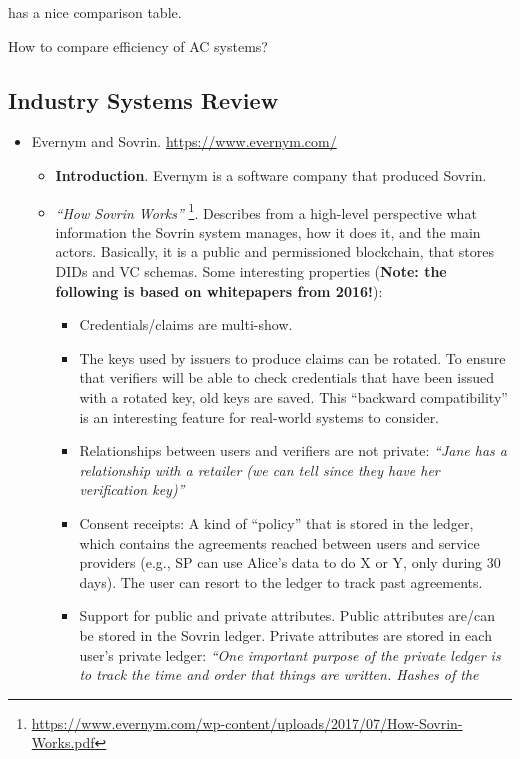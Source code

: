 \cite{fhs19} has a nice comparison table.

How to compare efficiency of AC systems?

\subsection{Industry Systems Review}

\begin{itemize}
\item Evernym and Sovrin. \url{https://www.evernym.com/}
  \begin{itemize}
  \item {\bf Introduction}. Evernym is a software company that produced Sovrin.
  \item \emph{``How Sovrin Works''}%
    \footnote{\url{https://www.evernym.com/wp-content/uploads/2017/07/How-Sovrin-Works.pdf}}.
    Describes from a high-level perspective what information the Sovrin system
    manages, how it does it, and the main actors. Basically, it is a public and
    permissioned blockchain, that stores DIDs and VC schemas.
    Some interesting properties (\textbf{Note: the following is based on
      whitepapers from 2016!}):
    \begin{itemize}
    \item Credentials/claims are multi-show.
    \item The keys used by issuers to produce claims can be rotated. To ensure
      that verifiers will be able to check credentials that have been issued
      with a rotated key, old keys are saved. This ``backward compatibility''
      is an interesting feature for real-world systems to consider.      
    \item Relationships between users and verifiers are not private:
      \emph{``Jane has a relationship with a retailer (we can tell since they
        have her verification key)''}
    \item Consent receipts: A kind of ``policy'' that is stored in the ledger,
      which contains the agreements reached between users and service providers
      (e.g., SP can use Alice's data to do X or Y, only during 30 days). The
      user can resort to the ledger to track past agreements.      
    \item Support for public and private attributes. Public attributes are/can
      be stored in the Sovrin ledger. Private attributes are stored in each
      user's private ledger: \emph{``One important purpose of the private ledger
        is to track the time and order that things are written. Hashes of the
}
\end{itemize}
\end{itemize}
\end{itemize}
